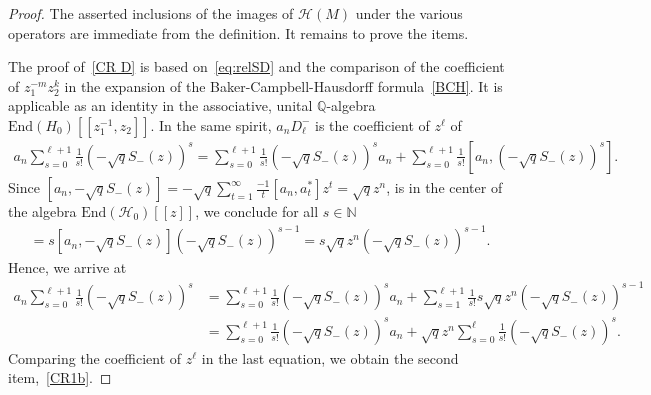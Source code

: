 \documentclass[letterpaper, DIV=17]{scrartcl}
\numberwithin{equation}{section}
\theoremstyle{definition}
\begin{document}
			\begin{proof}
			The asserted inclusions of the images of $ \mathcal{H}(M) $ under the various operators are immediate from the definition. 
			It remains to prove the items. 
			
			The proof of~\ref{CR D} is based on~\eqref{eq:relSD} and  the comparison of the coefficient of  $z_1^{-m} z_2^k$ in the 
			expansion of the  Baker\--Campbell\--Hausdorff formula~\eqref{BCH}. It is applicable \cite[Corollary 4.5]{bonfiglioli2011topics} as an identity in the associative, unital $\mathbb{Q}$-algebra $\mathrm{End}(H_0)[[z_1^{-1}, z_2]]$. 
			In the same spirit,  $a_n D_{\ell}^{-}$ is the coefficient of $z^{\ell}$ of 
			\begin{align*}
				a_n \sum_{s=0}^{\ell+1} \frac{1}{s!} \left( -\sqrt{q} S_-(z) \right)^s
				= \sum_{s=0}^{\ell+1} \frac{1}{s!} \left( -\sqrt{q} S_-(z) \right)^s a_n + \sum_{s=0}^{\ell+1} \frac{1}{s!} [a_n,\left( -\sqrt{q} S_-(z) \right)^s].
			\end{align*}
			Since
			$
				[a_n,-\sqrt{q} S_-(z)] = -\sqrt{q}\sum_{t=1}^\infty \frac{-1}{t} [a_n, a_t^*] z^{t}
				= \sqrt{q} z^n $, 
			is in the center of the algebra $\mathrm{End}(\mathcal{H}_0)[[z]]$, we conclude for all $s\in \mathbb{N}$
			\begin{align*}
				[a_n, (-\sqrt{q} S_-(z))^s] = s [a_n, -\sqrt{q} S_-(z)] (-\sqrt{q} S_-(z))^{s-1} = s \sqrt{q} z^n (-\sqrt{q} S_-(z))^{s-1}.
			\end{align*}
			Hence, we arrive at
			\begin{align*}
				a_n \sum_{s=0}^{\ell+1} \frac{1}{s!} \left( -\sqrt{q} S_-(z) \right)^s
				&= \sum_{s=0}^{\ell+1} \frac{1}{s!} \left( -\sqrt{q} S_-(z) \right)^s a_n + \sum_{s=1}^{\ell+1} \frac{1}{s!} s \sqrt{q} z^n (-\sqrt{q} S_-(z))^{s-1} \\
				&= \sum_{s=0}^{\ell+1} \frac{1}{s!} \left( -\sqrt{q} S_-(z) \right)^s a_n + \sqrt{q} z^n \sum_{s=0}^{\ell} \frac{1}{s!}  (-\sqrt{q} S_-(z))^{s}.
			\end{align*}
			Comparing the coefficient of $z^\ell$ in the last equation, we obtain the second item,~\ref{CR1b}. 
			
			
			
			
			

\end{proof}
\end{document}
